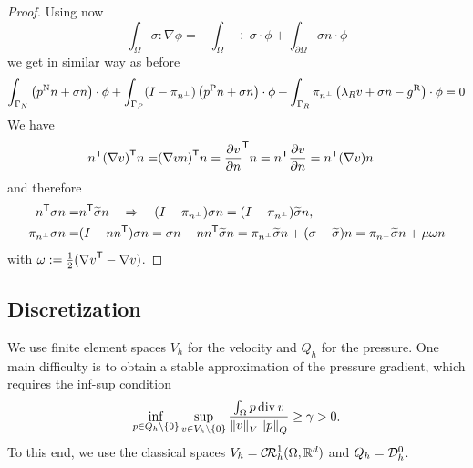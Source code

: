 %
\begin{proof}
Using now
%
%
\begin{equation}\label{eq:Stokes:ippsigma}
\int_{\Omega} \sigma:\nabla\phi = -\int_{\Omega} \div \sigma\cdot \phi+ \int_{\partial \Omega} \sigma n\cdot \phi
\end{equation}
%
we get in similar way as before
%
\begin{align*}
\int_{\Gamma_N} \left( p^{\rm N} n + \sigma n\right)\cdot\phi 
+ \int_{\Gamma_P}  (I-\pi_{n^{\perp}})\left( p^{\rm P} n+ \sigma n\right)\cdot\phi
+ \int_{\Gamma_R} \pi_{n^{\perp}}\left ( \lambda_R v + \sigma n -g^{\rm R} \right)\cdot\phi =0
\end{align*}
%
We have 
%
\begin{align*}
{n}^{\mathsf{T}}{(\nabla v)}^{\mathsf{T}} n =& {(\nabla v n)}^{\mathsf{T}} n = {\frac{\partial v}{\partial n}}^{\mathsf{T}} n= {n}^{\mathsf{T}}\frac{\partial v}{\partial n}=
{n}^{\mathsf{T}}(\nabla v) n
\end{align*}
%
and therefore
%
\begin{align*}
{n}^{\mathsf{T}}\sigma n =& {n}^{\mathsf{T}}\widetilde{\sigma} n\quad\Rightarrow\quad (I-\pi_{n^{\perp}})\sigma n= (I-\pi_{n^{\perp}})\widetilde{\sigma} n,\\ 
\pi_{n^{\perp}} \sigma n =& (I-n{n}^{\mathsf{T}})\sigma n = \sigma n - n{n}^{\mathsf{T}}\widetilde{\sigma} n = \pi_{n^{\perp}} \widetilde{\sigma} n  + (\sigma-\widetilde{\sigma}) n = \pi_{n^{\perp}} \widetilde{\sigma} n  + \mu \omega n
\end{align*}
%
with $\omega := \frac{1}{2}({\nabla v}^{\mathsf{T}}-\nabla v)$.
\end{proof}
%
%
\subsection{Discretization}\label{subsec:}
%
We use finite element spaces $V_h$ for the velocity and $Q_h$ for the pressure. One main difficulty is to obtain a stable approximation of the pressure gradient, which requires the inf-sup condition
%
\begin{equation}\label{eq:stokes:infsupgrad}
\inf_{p\in Q_h\setminus\left\{0\right\}}\sup_{v\in V_h\setminus\left\{0\right\}} \frac{\int_{\Omega}p\operatorname{div} v}{\left\|v\right\|_V\left\|p\right\|_Q} \ge \gamma >0.
\end{equation}
%
To this end, we use the classical spaces $V_h = \mathcal{C\!R}^1_h(\Omega,\mathbb R^d)$ and $Q_h=\mathcal{D}_h^0$.
%
